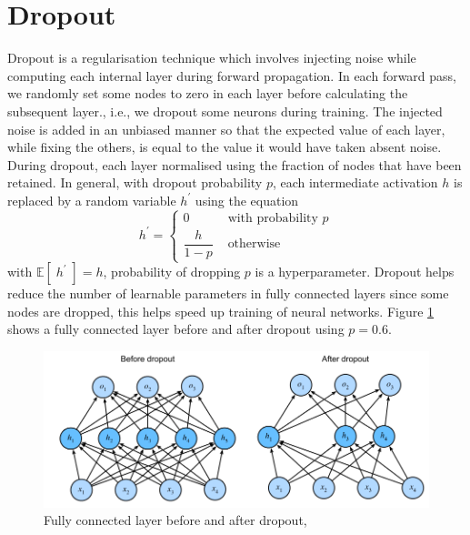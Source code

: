 \documentclass[12pt]{report}
\numberwithin{equation}{section}
\begin{document}
\section{Dropout}
Dropout {\cite{vsrivastava14a}} is a regularisation technique which involves injecting noise while computing each internal layer during forward propagation. In each forward pass, we randomly set some nodes to zero in each layer before calculating the subsequent layer., i.e., we dropout some neurons during training. The injected noise is added in an unbiased manner so that the expected value of each layer, while fixing the others, is equal to the value it would have taken absent noise. During dropout, each layer  normalised using the fraction of nodes that have been retained. In general, with dropout probability $p$, each intermediate activation $h$ is replaced by a random variable $h^{\prime}$ using the equation
\begin{equation}\label{eqn:dropout}
h^{\prime}=\left\{\begin{array}{ll}
0 & \text { with probability } p \\
\dfrac{h}{1-p} & \text { otherwise }
\end{array}\right.
\end{equation} \noindent 
with $\mathbb{E}[\;h^{\prime}\;] = h$, probability of dropping $p$ is a hyperparameter. Dropout helps reduce the number of learnable parameters in fully connected layers since some nodes are dropped, this helps speed up training of neural networks. Figure \ref{fig:dropout} shows a fully connected layer before and after dropout using $p=0.6$.
\begin{figure}[H]
\centering
\includegraphics[scale=0.9]{png/dropout.png}
\caption[Fully connected layer before and after dropout]{Fully connected layer before and after dropout, {\cite{zhang2020dive}}}
\label{fig:dropout}
\end{figure}
\end{document}
